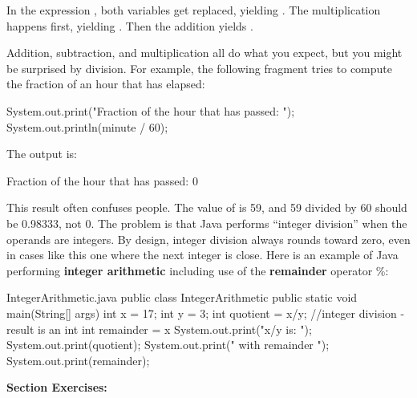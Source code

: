 In the expression , both variables get replaced, yielding .
The multiplication happens first, yielding .
Then the addition yields .

Addition, subtraction, and multiplication all do what you expect, but you might be surprised by division.
For example, the following fragment tries to compute the fraction of an hour that has elapsed:%

\begin{code}
System.out.print("Fraction of the hour that has passed: ");
System.out.println(minute / 60);
\end{code}

The output is:

\begin{stdout}
Fraction of the hour that has passed: 0
\end{stdout}


This result often confuses people.
The value of  is 59, and 59 divided by 60 should be 0.98333, not 0.
The problem is that Java performs ``integer division'' when the operands are integers.
By design, integer division always rounds toward zero, even in cases like this one where the next integer is close.
Here is an example of Java performing {\bf integer arithmetic} including use of the {\bf remainder} operator \%:
\begin{trinket}[270]{IntegerArithmetic.java}
public class IntegerArithmetic {
    public static void main(String[] args) {
        int x = 17;
        int y = 3;
        int quotient = x/y;  //integer division - result is an int
        int remainder = x%
        System.out.print("x/y is: ");
        System.out.print(quotient);
        System.out.print(" with remainder ");
        System.out.print(remainder);
    }
}
\end{trinket}


\textbf{Section Exercises:}

